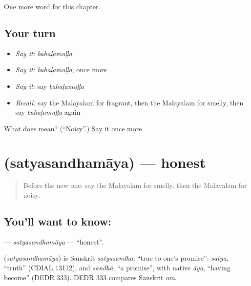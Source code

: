 \begin{grammarlens}[title={What you've built}]
One more word for this chapter.
\end{grammarlens}

\subsection*{Your turn}
\begin{itemize}
\raggedright
  \item \emph{Say it:} \emph{bahaḷamuḷḷa}
  \item \emph{Say it:} \emph{bahaḷamuḷḷa}, once more
  \item \emph{Say it:} say \emph{bahaḷamuḷḷa}
  \item \emph{Recall:} say the Malayalam for fragrant, then the Malayalam for smelly, then say \emph{bahaḷamuḷḷa} again
\end{itemize}

\begin{tcolorbox}[breakable,colback=teal!4,colframe=teal!35!black,title={Before you move on}]
What does  mean? (\textquotedblleft{}Noisy\textquotedblright{}.) Say it once more.
\end{tcolorbox}
\section[\texorpdfstring{\ml{സത്യസന്ധമായ} (satyasandhamāya)}{സത്യസന്ധമായ (satyasandhamāya)}]{ (satyasandhamāya) — honest}

\label{lesson:ML-C321-satyasandhamaya}



\begin{quote}
Before the new one: say the Malayalam for smelly, then the Malayalam for noisy.
\end{quote}

\subsection*{You'll want to know: }
\textbf{} — \emph{satyasandhamāya} — \textquotedblleft{}honest\textquotedblright{}.

\begin{cousinweb}
\textbf{} (\emph{satyasandhamāya}) is Sanskrit \emph{satyasandha}, \textquotedblleft{}true to one's promise\textquotedblright{}: \emph{satya}, \textquotedblleft{}truth\textquotedblright{} (CDIAL 13112), and \emph{sandhā}, \textquotedblleft{}a promise\textquotedblright{}, with native \emph{āya}, \textquotedblleft{}having become\textquotedblright{} (DEDR 333). DEDR 333 compares Sanskrit \emph{ām}.
\end{cousinweb}

